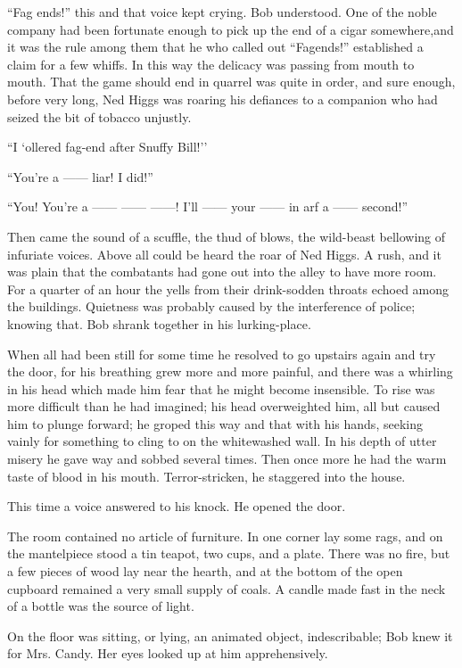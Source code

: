 ``Fag ends!'' this and that voice kept crying. Bob understood. One of
the noble company had been fortunate enough to pick up the end of a
cigar somewhere,and it was the rule among them that he who called out
``Fagends!'' established a claim for a few whiffs. In this way the
delicacy was passing from mouth to mouth. That the game should end {}in
quarrel was quite in order, and sure enough, before very long, Ned Higgs
was roaring his defiances to a companion who had seized the bit of
tobacco unjustly.

``I `ollered fag-end after Snuffy Bill!''

``You're a {{------}} liar! I did!''

``You! You're a {{------}} {{------}} {{------}}! I'll {{------}} your
{{------}} in arf a {{------}} second!''

Then came the sound of a scuffle, the thud of blows, the wild-beast
bellowing of infuriate voices. Above all could be heard the roar of Ned
Higgs. A rush, and it was plain that the combatants had gone out into
the alley to have more room. For a quarter of an hour the yells from
their drink-sodden throats echoed among the buildings. Quietness was
probably caused by the interference of police; knowing that. Bob shrank
together in his lurking-place.

When all had been still for some time he resolved to go upstairs again
and try the door, for his breathing grew more and more painful, and
there was a whirling in his head which made him fear that he might
become insensible. To rise was more difficult than he had imagined; his
head overweighted him, all but caused him to plunge forward; he groped
this {}way and that with his hands, seeking vainly for something to
cling to on the whitewashed wall. In his depth of utter misery he gave
way and sobbed several times. Then once more he had the warm taste of
blood in his mouth. Terror-stricken, he staggered into the house.

This time a voice answered to his knock. He opened the door.

The room contained no article of furniture. In one corner lay some rags,
and on the mantelpiece stood a tin teapot, two cups, and a plate. There
was no fire, but a few pieces of wood lay near the hearth, and at the
bottom of the open cupboard remained a very small supply of coals. A
candle made fast in the neck of a bottle was the source of light.

On the floor was sitting, or lying, an animated object, indescribable;
Bob knew it for Mrs. Candy. Her eyes looked up at him apprehensively.

